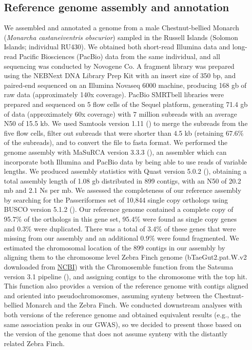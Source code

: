 \subsection{Reference genome assembly and annotation}
We assembled and annotated a genome from a male Chestnut-bellied Monarch (\textit{Monarcha castaneiventris obscurior}) sampled in the Russell Islands (Solomon Islands; individual RU430). We obtained both short-read Illumina data and long-read Pacific Biosciences (PacBio) data from the same individual, and all sequencing was conducted by Novogene Co. A fragment library was prepared using the NEBNext DNA Library Prep Kit with an insert size of 350 bp, and paired-end sequenced on an Illumina Novaseq 6000 machine, producing 168 gb of raw data (approximately 140x coverage). PacBio SMRTbell libraries were prepared and sequenced on 5 flow cells of the Sequel platform, generating 71.4 gb of data (approximately 60x coverage) with 7 million subreads with an average N50 of 15.5 kb. We used Samtools version 1.11 (\cite{li2009sequence}) to merge the subreads from the five flow cells, filter out subreads that were shorter than 4.5 kb (retaining 67.6\% of the subreads), and to convert the file to fasta format. We performed the genome assembly with MaSuRCA version 3.3.3 (\cite{zimin2013masurca}), an assembler which can incorporate both Illumina and PacBio data by being able to use reads of variable lengths. We produced assembly statistics with Quast version 5.0.2 (\cite{gurevich2013quast}), obtaining a total assembly length of 1.08 gb distributed in 899 contigs, with an N50 of 20.2 mb and 2.1 Ns per mb. We assessed the completeness of our reference assembly by searching for the Passeriformes set of 10,844 single copy orthologs using BUSCO version 5.1.2 (\cite{simao2015busco}). Our reference genome contained a complete copy of 95.7\% of the orthologs in this gene set, 95.4\% were found as single copy genes and 0.3\% were duplicated. There was a total of 3.4\% of these genes that were missing from our assembly and an additional 0.9\% were found fragmented. We estimated the chromosomal location of the 899 contigs in our assembly by aligning them to the chromosome level Zebra Finch genome (bTaeGut2.pat.W.v2 downloaded from \href{http://www.ncbi.nlm.nih.gov/}{NCBI}) with the Chromosemble function from the Satsuma version 3.1 pipeline (\cite{grabherr2010genome}), and assigning contigs to the chromosome with the top hit. This function also provides a version of the reference genome with contigs aligned and oriented into pseudochromosomes, assuming synteny between the Chestnut-bellied Monarch and the Zebra Finch. We conducted downstream analyses with both versions of the reference genome and obtained equivalent results (e.g., the same association peaks in our \acs{GWAS}), so we decided to present those based on the version of the genome that does not assume synteny with the distantly related Zebra Finch.

